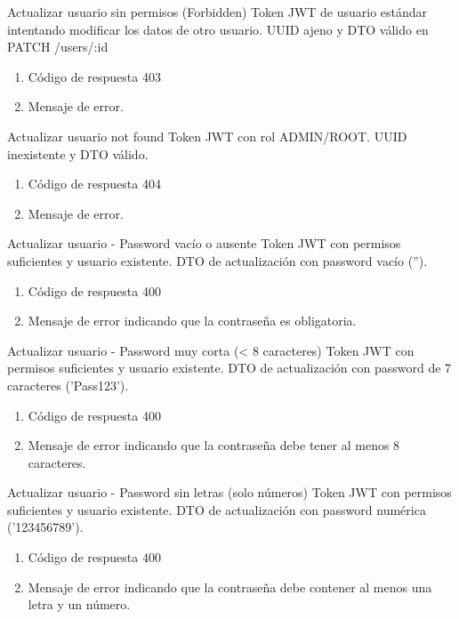 {Actualizar usuario sin permisos (Forbidden)}
{Token JWT de usuario estándar intentando modificar los datos de otro usuario.}
{UUID ajeno y DTO válido en PATCH /users/:id}
{\begin{enumerate} [leftmargin=*, nosep]
    \item Código de respuesta 403
    \item Mensaje de error.
\end{enumerate}}

{Actualizar usuario not found}
{Token JWT con rol ADMIN/ROOT.}
{UUID inexistente y DTO válido.}
{\begin{enumerate} [leftmargin=*, nosep]
    \item Código de respuesta 404
    \item Mensaje de error.
\end{enumerate}}

{Actualizar usuario - Password vacío o ausente}
{Token JWT con permisos suficientes y usuario existente.}
{DTO de actualización con password vacío ('').}
{\begin{enumerate} [leftmargin=*, nosep]
    \item Código de respuesta 400
    \item Mensaje de error indicando que la contraseña es obligatoria.
\end{enumerate}}

{Actualizar usuario - Password muy corta (< 8 caracteres)}
{Token JWT con permisos suficientes y usuario existente.}
{DTO de actualización con password de 7 caracteres ('Pass123').}
{\begin{enumerate} [leftmargin=*, nosep]
    \item Código de respuesta 400
    \item Mensaje de error indicando que la contraseña debe tener al menos 8 caracteres.
\end{enumerate}}

{Actualizar usuario - Password sin letras (solo números)}
{Token JWT con permisos suficientes y usuario existente.}
{DTO de actualización con password numérica ('123456789').}
{\begin{enumerate} [leftmargin=*, nosep]
    \item Código de respuesta 400
    \item Mensaje de error indicando que la contraseña debe contener al menos una letra y un número.
\end{enumerate}}

